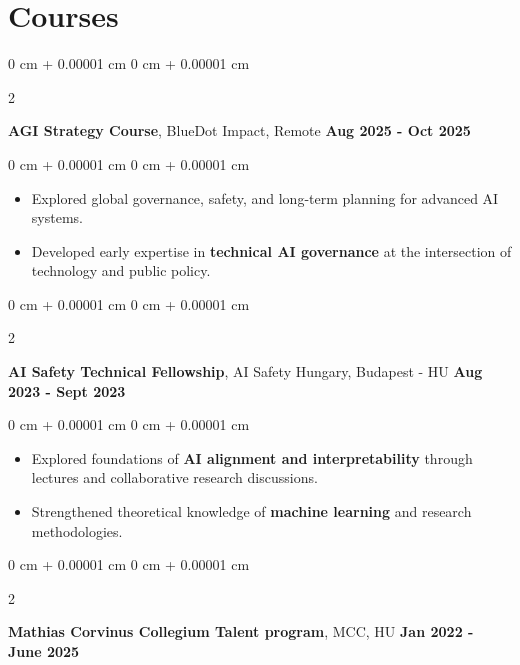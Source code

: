\documentclass[10pt, letterpaper]{article}
\newenvironment{highlights}{
    \begin{itemize}[
        topsep=0.10 cm,
        parsep=0.10 cm,
        partopsep=0pt,
        itemsep=0pt,
        leftmargin=0 cm + 10pt
    ]
}{
    \end{itemize}
} %
\newenvironment{onecolentry}{
    \begin{adjustwidth}{
        0 cm + 0.00001 cm
    }{
        0 cm + 0.00001 cm
    }
}{
    \end{adjustwidth}
} %
\newenvironment{twocolentry}[2][]{
    \onecolentry
    \def\secondColumn{#2}
    \setcolumnwidth{\fill, 4.5 cm}
    \begin{paracol}{2}
}{
    \switchcolumn \raggedleft \secondColumn
    \end{paracol}
    \endonecolentry
} %
\begin{document}
        \vspace{0.2 cm}

    \section{Courses}
    
        \begin{twocolentry}{
        \textbf{Aug 2025 - Oct 2025}
        }
            \textbf{AGI Strategy Course}, BlueDot Impact, Remote\end{twocolentry}

        \vspace{0.1 cm}
        
        \begin{onecolentry}
            \begin{highlights}
                \item Explored global governance, safety, and long-term planning for advanced AI systems.
                \item Developed early expertise in \textbf{technical AI governance} at the intersection of technology and public policy.
            \end{highlights}
        \end{onecolentry}
    
        \begin{twocolentry}{
        \textbf{Aug 2023 - Sept 2023}
        }
            \textbf{AI Safety Technical Fellowship}, AI Safety Hungary, Budapest - HU\end{twocolentry}

        \vspace{0.1 cm}
        
        \begin{onecolentry}
            \begin{highlights}
                \item Explored foundations of \textbf{AI alignment and interpretability} through lectures and collaborative research discussions.
                \item Strengthened theoretical knowledge of \textbf{machine learning} and research methodologies.
            \end{highlights}
        \end{onecolentry}

        \vspace{0.2 cm}
        
        \begin{twocolentry}{
        \textbf{Jan 2022 - June 2025}
        }
            \textbf{Mathias Corvinus Collegium Talent program}, MCC, HU\end{twocolentry}
\end{document}
